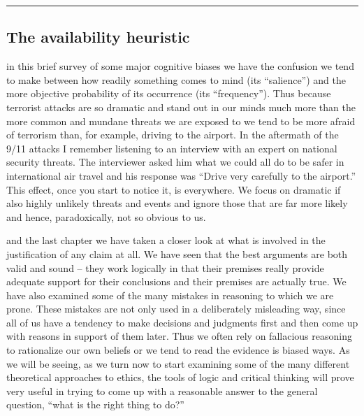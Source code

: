 \documentclass[justified]{tufte-book}
\begin{document}
\begin{center}\rule{0.5\linewidth}{\linethickness}\end{center}

\hypertarget{the-availability-heuristic}{%
\subsection*{The availability heuristic}\label{the-availability-heuristic}}

 in this brief survey of some major cognitive biases we have the confusion we tend to make between how readily something comes to mind (its ``salience'') and the more objective probability of its occurrence (its ``frequency''). Thus because terrorist attacks are so dramatic and stand out in our minds much more than the more common and mundane threats we are exposed to we tend to be more afraid of terrorism than, for example, driving to the airport. In the aftermath of the 9/11 attacks I remember listening to an interview with an expert on national security threats. The interviewer asked him what we could all do to be safer in international air travel and his response was ``Drive very carefully to the airport.'' This effect, once you start to notice it, is everywhere. We focus on dramatic if also highly unlikely threats and events and ignore those that are far more likely and hence, paradoxically, not so obvious to us.

 and the last chapter we have taken a closer look at what is involved in the justification of any claim at all. We have seen that the best arguments are both valid and sound -- they work logically in that their premises really provide adequate support for their conclusions and their premises are actually true. We have also examined some of the many mistakes in reasoning to which we are prone. These mistakes are not only used in a deliberately misleading way, since all of us have a tendency to make decisions and judgments first and then come up with reasons in support of them later. Thus we often rely on fallacious reasoning to rationalize our own beliefs or we tend to read the evidence is biased ways. As we will be seeing, as we turn now to start examining some of the many different theoretical approaches to ethics, the tools of logic and critical thinking will prove very useful in trying to come up with a reasonable answer to the general question, ``what is the right thing to do?''
\end{document}
